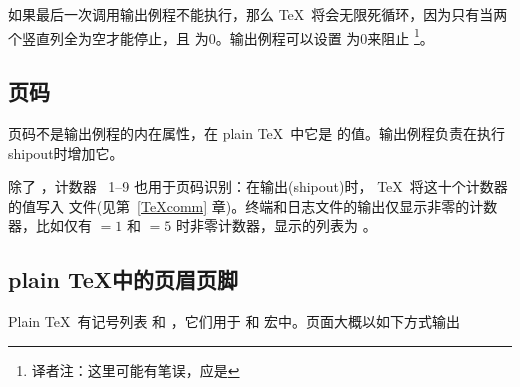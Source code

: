 \documentclass{book}
\begin{document}
如果最后一次调用输出例程不能执行，那么 \TeX\  将会无限死循环，因为只有当两个竖直列全为空才能停止，且  为0。输出例程可以设置  为0来阻止
\footnote{译者注：这里可能有笔误，应是}。


\subsection{页码}

页码不是输出例程的内在属性，在 plain \TeX\ 中它是  的值。输出例程负责在执行shipout时增加它。



除了  ，计数器 ~1--9 也用于页码识别：在输出(shipout)时， \TeX\ 将这十个计数器的值写入  文件(见第~\ref{TeXcomm} 章)。终端和日志文件的输出仅显示非零的计数器，比如仅有 ${}=1$ 和
${}=5$ 时非零计数器，显示的列表为 \n{[1.0.0.5]} 。



\subsection{plain \TeX 中的页眉页脚}

Plain \TeX\ 有记号列表  和
，它们用于  和  宏中。页面大概以如下方式输出
\end{document}
